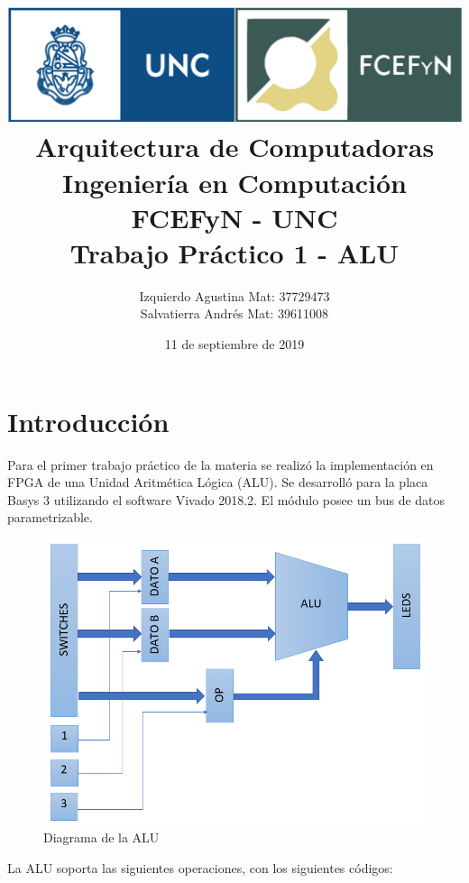 \documentclass[a4paper]{article}
\begin{document}
\title{%
\includegraphics[scale = 0.5]{./header_unc.png}\\[1.0 cm]	%
  Arquitectura de Computadoras \\
  \large Ingeniería en Computación FCEFyN - UNC\\
  		Trabajo Práctico 1 - ALU
  }


  \author{Izquierdo Agustina Mat: 37729473\\
          Salvatierra Andrés Mat: 39611008}
  
  \date{11 de septiembre de 2019}
\maketitle
\newpage
\section{Introducción}

Para el primer trabajo práctico de la materia se realizó la implementación en FPGA de una Unidad Aritmética Lógica (ALU). Se desarrolló para la placa Basys 3 utilizando el software Vivado 2018.2. El módulo posee un bus de datos parametrizable. 

\begin{figure}[!htb]
\centering
\includegraphics[width=.6\textwidth]{alu.jpg}
\caption{\label{fig:alu}Diagrama de la ALU}
\end{figure}

La ALU soporta las siguientes operaciones, con los siguientes códigos:\\
\end{document}
